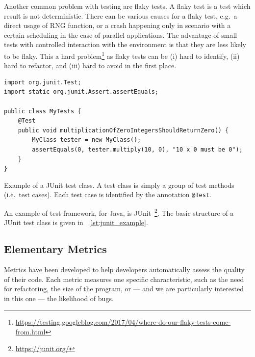 \documentclass[a4paper,11pt]{sdm_internship}
\newcommand{\todo}[1]{\colorbox{Red!75}{\textcolor{white}{\textbf{TODO\ifx&#1&\else: #1\fi}}}}
\theoremstyle{definition}
\begin{document}
Another common problem with testing are flaky tests.
A flaky test is a test which result is not deterministic.
There can be various causes for a flaky test, e.g.\ a direct usage of RNG function, or a crash happening only in scenario with a certain scheduling in the case of parallel applications.
The advantage of small tests with controlled interaction with the environment is that they are less likely to be flaky.
This a hard problem\footnote{\url{https://testing.googleblog.com/2017/04/where-do-our-flaky-tests-come-from.html}} as flaky tests can be (i) hard to identify, (ii) hard to refactor, and (iii) hard to avoid in the first place.


\begin{listing}
  \centering
  \begin{verbatim}
import org.junit.Test;
import static org.junit.Assert.assertEquals;

public class MyTests {
    @Test
    public void multiplicationOfZeroIntegersShouldReturnZero() {
        MyClass tester = new MyClass();
        assertEquals(0, tester.multiply(10, 0), "10 x 0 must be 0");
    }
}
  \end{verbatim}
  \caption{Example of a JUnit test class. A test class is simply a group of test methods (i.e.\ test cases). Each test case is identified by the annotation \texttt{@Test}.}%
\label{lst:junit_example}
\end{listing}
An example of test framework, for Java, is JUnit~\footnote{\url{https://junit.org/}}.
The basic structure of a JUnit test class is given in \listingname~\ref{lst:junit_example}.


\subsection{Elementary Metrics}%
\label{ssec:elementary_metrics}
Metrics have been developed to help developers automatically assess the quality of their code.
Each metric measures one specific characteristic, such as the need for refactoring, the size of the program, or --- and we are particularly interested in this one --- the likelihood of bugs.
\end{document}
